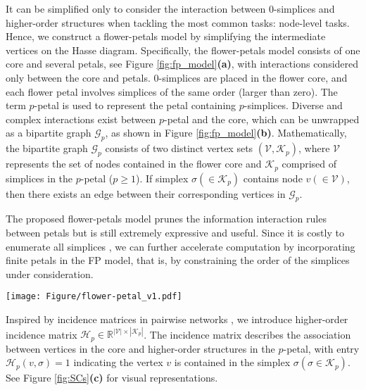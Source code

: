\documentclass[letterpaper]{article} \usepackage{aaai24}
\theoremstyle{plain}
\theoremstyle{definition}
\theoremstyle{remark}
\begin{document}
It can be simplified only to consider the interaction between $0$-simplices and higher-order structures when tackling the most common tasks: node-level tasks.
Hence, we construct a flower-petals model by simplifying the intermediate vertices on the Hasse diagram. 
Specifically, the flower-petals model consists of one core and several petals, see Figure \ref{fig:fp_model}\textbf{(a)}, with interactions considered only between the core and petals. 
$0$-simplices are placed in the flower core, and each flower petal involves simplices of the same order (larger than zero).
The term $p$-petal is used to represent the petal containing $p$-simplices.
Diverse and complex interactions exist between $p$-petal and the core, which can be unwrapped as a bipartite graph $\mathcal{G}_p$, as shown in Figure \ref{fig:fp_model}\textbf{(b)}. 
Mathematically, the bipartite graph $\mathcal{G}_p$ consists of two distinct vertex sets $\left(\mathcal{V},\mathcal{K}_p\right)$, where $\mathcal{V}$ represents the set of nodes contained in the flower core and $\mathcal{K}_p$ comprised of simplices in the $p$-petal ($p \geq 1$). If simplex $\sigma (\in \mathcal{K}_p)$ contains node $v(\in \mathcal{V})$, then there exists an edge between their corresponding vertices in $\mathcal{G}_p$.




The proposed flower-petals model prunes the information interaction rules between petals but is still extremely expressive and useful. 
Since it is costly to enumerate all simplices \cite{maxClique1999}, we can further accelerate computation by incorporating finite petals in the FP model, that is, by constraining the order of the simplices under consideration.

\begin{figure*}[!t]
\centering
\texttt{[image: Figure/flower-petal\_v1.pdf]}
\caption{\textbf{An illustration of the flower-petals model for SCs.} \textbf{a} displays the flower-petals model. The interactions between petals and the core can be unwrapped as a bipartite graph, as depicted in  \textbf{b}.
\textbf{c} visualizes the learnable convolutional filters $g_p$ derived from different  flower-petals (FP) Laplacians, which are constructed based on two-step random walk dynamics on \textbf{b}.}
\label{fig:fp_model}
\end{figure*}




Inspired by incidence matrices in pairwise networks \cite{Hmatric}, we introduce higher-order incidence matrix $\mathcal{H}_p \in \mathbb{R}^{|\mathcal{V}| \times |\mathcal{K}_p| }$. 
The incidence matrix describes the association between vertices in the core and higher-order structures in the $p$-petal, with entry $\mathcal{H}_p(v,\sigma)=1$ indicating the vertex $v$ is contained in the simplex $\sigma (\sigma \in \mathcal{K}_p)$. See Figure \ref{fig:SCs}\textbf{(c)} for visual representations.
\end{document}
